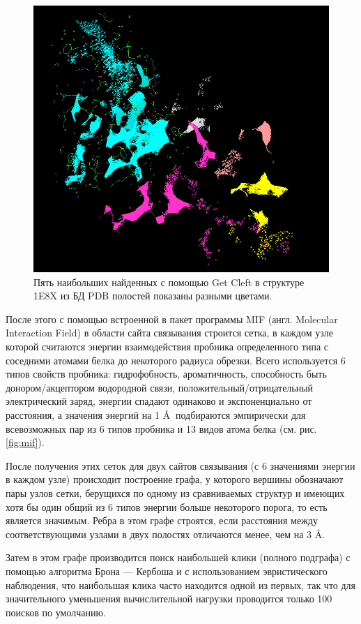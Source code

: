 \documentclass[a4paper,14pt]{article}         %
\begin{document}
\begin{figure} 
		\centering
		\includegraphics[width=0.6\linewidth]{pictures/clefts}
		\caption{Пять наибольших найденных с помощью Get Cleft в структуре 1E8X из БД PDB полостей показаны разными цветами.}
		\label{fig:cleft}
\end{figure}

После этого с помощью встроенной в пакет программы MIF (англ. Molecular Interaction Field) в области сайта связывания строится сетка, в каждом узле которой считаются энергии взаимодействия пробника определенного типа с соседними атомами белка до некоторого радиуса обрезки. Всего используется 6 типов свойств пробника: гидрофобность, ароматичность, способность быть донором/акцептором водородной связи, положительный/отрицательный электрический заряд, энергии спадают одинаково и экспоненциально от расстояния, а значения энергий на 1 \AA $\:$ подбираются эмпирически для всевозможных пар из 6 типов пробника и 13 видов атома белка (см. рис. \ref{fig:mif}).

После получения этих сеток для двух сайтов связывания (с 6 значениями энергии в каждом узле) происходит построение графа, у которого вершины обозначают пары узлов сетки, берущихся по одному из сравниваемых структур и имеющих хотя бы один общий из 6 типов энергии больше некоторого порога, то есть является значимым. Ребра в этом графе строятся, если расстояния между соответствующими узлами в двух полостях отличаются менее, чем на 3 \AA. 

Затем в этом графе производится поиск наибольшей клики (полного подграфа) с помощью алгоритма Брона — Кербоша \cite{Bron1973, Tomita2006} и с использованием эвристического наблюдения, что наибольшая клика часто находится одной из первых, так что для значительного уменьшения вычислительной нагрузки проводится только 100 поисков по умолчанию. 
\end{document}
